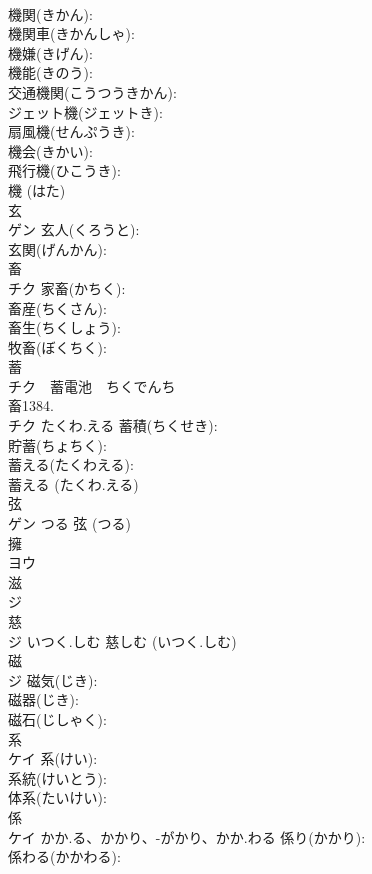 \documentclass[8pt]{extreport}
\begin{document}
\begin{CJK}{UTF8}{min}
\\	機関(きかん): 
\\	機関車(きかんしゃ): 
\\	機嫌(きげん): 
\\	機能(きのう): 
\\	交通機関(こうつうきかん): 
\\	ジェット機(ジェットき): 
\\	扇風機(せんぷうき): 
\\	機会(きかい): 
\\	飛行機(ひこうき): 
\\	機 (はた)
\\	玄			
\\	ゲン		玄人(くろうと): 
\\	玄関(げんかん): 
\\	畜			
\\	チク		家畜(かちく): 
\\	畜産(ちくさん): 
\\	畜生(ちくしょう): 
\\	牧畜(ぼくちく): 
\\	蓄			
\\	チク　蓄電池　ちくでんち
\\	畜1384.	
\\	チク	たくわ.える	蓄積(ちくせき): 
\\	貯蓄(ちょちく): 
\\	蓄える(たくわえる): 
\\	蓄える (たくわ.える)
\\	弦			
\\	ゲン	つる		弦 (つる)
\\	擁			
\\	ヨウ			
\\	滋			
\\	ジ			
\\	慈			
\\	ジ	いつく.しむ		慈しむ (いつく.しむ)
\\	磁			
\\	ジ		磁気(じき): 
\\	磁器(じき): 
\\	磁石(じしゃく): 
\\	系			
\\	ケイ		系(けい): 
\\	系統(けいとう): 
\\	体系(たいけい): 
\\	係			
\\	ケイ	かか.る、かかり、-がかり、かか.わる	係り(かかり): 
\\	係わる(かかわる): 

\end{CJK}
\end{document}

